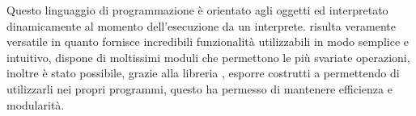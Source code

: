 Questo linguaggio di programmazione è orientato agli oggetti ed interpretato dinamicamente al momento dell'esecuzione da un interprete.  risulta veramente versatile in quanto fornisce incredibili funzionalità utilizzabili in modo semplice e intuitivo, dispone di moltissimi moduli che permettono le più svariate operazioni, inoltre è stato possibile, grazie alla libreria , esporre costrutti  a  permettendo di utilizzarli nei propri programmi, questo ha permesso di mantenere efficienza e modularità.

